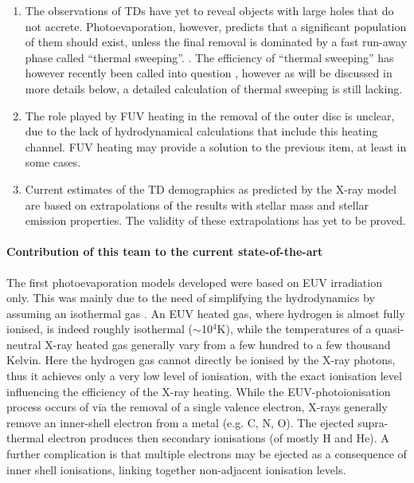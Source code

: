 \documentclass[10pt,fleqn,twoside]{article}
\begin{document}
\begin{enumerate}
\item The observations of TDs have yet to reveal objects with large
  holes that do not accrete. Photoevaporation, however, predicts that a
  significant population of them should exist, unless the final
  removal is dominated by a fast run-away
  phase called ``thermal sweeping''. 
  \citep{2012MNRAS.422.1880O}.
  The
  efficiency of  ``thermal sweeping'' has however recently been called
  into question 
  \citep{2016MNRAS.457.1905H}, however as will be discussed in more
  details below, a detailed calculation of thermal
  sweeping is still lacking. 
\item The role played by FUV heating in the removal of the outer disc
  is unclear, due to the lack of hydrodynamical calculations that
  include this heating channel. FUV heating may provide a solution to the
 previous item, at least in some cases. 
\item Current estimates of the TD demographics as predicted by the X-ray
  model are based on extrapolations of the results with stellar mass
  and stellar emission properties. The validity of these
  extrapolations has yet to be proved. 
\end{enumerate}

\paragraph{Contribution of this team to the current state-of-the-art}

The first photoevaporation models developed were based on EUV
irradiation only. This was mainly due to the need of simplifying the
hydrodynamics by assuming an isothermal gas
\citep[]{2006MNRAS.369..216A, 2006MNRAS.369..229A}. 
An EUV heated gas, where
hydrogen is almost fully ionised, is indeed roughly isothermal
($\sim$10$^4$K), while the temperatures of a quasi-neutral X-ray
heated gas generally vary from a few hundred to a few thousand 
Kelvin. Here the hydrogen gas cannot directly be ionised by the X-ray
photons, 
thus it achieves only a very low level of ionisation, with the
exact ionisation level influencing the efficiency of the X-ray
heating. While the EUV-photoionisation process occurs of via the removal
of a single valence electron, X-rays generally remove an inner-shell
electron from a metal (e.g. C, N, O). The ejected supra-thermal electron produces then secondary
ionisations (of mostly H and He). A further complication is that multiple electrons may be
ejected as a consequence of inner shell ionisations, linking together
non-adjacent ionisation levels.
\end{document}
